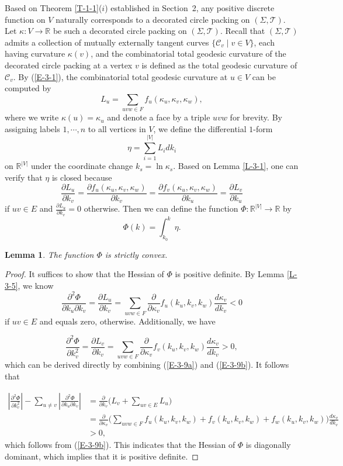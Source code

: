 \documentclass[11pt,leqno]{article}
\numberwithin{equation}{section}
\newtheorem{lemma}[theorem]{Lemma}
\theoremstyle{definition}
\begin{document}
Based on Theorem \ref{T-1-1}($i$) established in Section~2, any positive discrete function on $V$ naturally corresponds to a decorated circle packing on $(\Sigma,\mathcal T)$.
Let $\kappa:V\to\mathbb{R}$ be such a decorated circle packing on $(\Sigma,\mathcal T)$.
Recall that \( (\Sigma, \mathcal{T}) \) admits a collection of mutually externally tangent curves \( \{\mathcal{C}_v \mid v \in V\} \), each having curvature \( \kappa(v) \), and the combinatorial total geodesic curvature of the decorated circle packing at a vertex \( v \) is defined as the total geodesic curvature of \( \mathcal{C}_v \).
By (\ref{E-3-1}), the combinatorial total geodesic curvature at $u\in V$ can be computed by
\[
L_u=\sum_{uvw\in F} f_u(\kappa_u,\kappa_v,\kappa_w),
\]
 where we write $\kappa(u)=\kappa_u$ and denote a face by a triple $uvw$ for brevity.
By assigning labels $1,\cdots,n$ to all vertices in $V$, we define the differential $1$-form
\[
\eta=\sum_{i=1}^{|V|}L_idk_i
\]
on $\mathbb{R}^{|V|}$ under the coordinate change \(k_s = \ln \kappa_s\). Based on Lemma \ref{L-3-1}, one can verify that $\eta$ is closed because
\[\frac{\partial L_u}{\partial k_v}=\frac{\partial f_u(\kappa_u,\kappa_v,\kappa_w)}{\partial k_v}=\frac{\partial f_v(\kappa_u,\kappa_v,\kappa_w)}{\partial k_u}=\frac{\partial L_v}{\partial k_u}\]
if $uv\in E$ and $\frac{\partial L_u}{\partial k_v}=0$ otherwise.
Then we can define the function $\Phi:\mathbb{R}^{|V|}\to\mathbb{R}$ by
\begin{equation}\label{E-4-1}
\Phi(k)=\int_{k_0}^k\eta.
\end{equation}
\begin{lemma}\label{L-4-1}
The function $\Phi$ is strictly convex.
\end{lemma}
\begin{proof}
It suffices to show that the Hessian of $\Phi$ is positive definite. By Lemma \ref{L-3-5}, we know
\[\frac{\partial^2\Phi}{\partial k_u\partial k_v}=\frac{\partial L_u}{\partial k_v}=\sum_{uvw\in F}\frac{\partial}{\partial \kappa_v} f_u(k_u,k_v,k_w)\frac{d\kappa_v}{dk_v} <0\]
if $uv\in E$ and equals zero, otherwise.
Additionally, we have

\[\frac{\partial^2\Phi}{\partial k_v^2}=\frac{\partial L_v}{\partial k_v}=\sum_{uvw\in F}\frac{\partial}{\partial \kappa_v} f_v(k_u,k_v,k_w)\frac{d\kappa_v}{dk_v}>0,\]
which can be derived directly by combining (\ref{E-3-9a}) and (\ref{E-3-9b}). It follows that

\[\begin{aligned}
\left|\frac{\partial^2\Phi}{\partial k_v^2}\right|-\sum_{u\neq v}\left|\frac{\partial^2\Phi}{\partial k_u\partial k_v}\right|&=\frac{\partial }{\partial k_v}\bigg(L_v+\sum_{uv\in E}L_u\bigg)\\
&=\frac{\partial }{\partial \kappa_v}\bigg(\sum_{uvw\in F} f_u(k_u,k_v,k_w)+ f_v(k_u,k_v,k_w)+f_w(k_u,k_v,k_w)\bigg)\frac{d\kappa_v}{dk_v}\\
&>0,
\end{aligned}\]
which follows from (\ref{E-3-9b}). This indicates that the Hessian of $\Phi$ is diagonally dominant, which implies that it is positive definite.
\end{proof}
\end{document}
